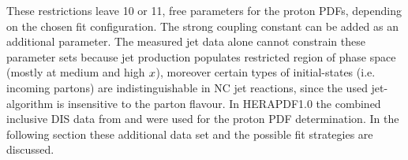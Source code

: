 These restrictions leave 10 or 11, free parameters for the proton PDFs, depending on the chosen fit configuration. The strong coupling constant \asz can be added as an additional parameter. The measured jet data alone cannot constrain these parameter sets because jet production populates restricted region of phase space (mostly at medium and high $\mbox{${x}$}$), moreover certain types of initial-states (i.e. incoming partons) are indistinguishable in NC jet reactions, since the used jet-algorithm is insensitive to the parton flavour. In HERAPDF1.0 the combined inclusive DIS data from \hone and \zeus were used for the proton PDF determination. In the following section these additional data set and the possible fit strategies are discussed.
